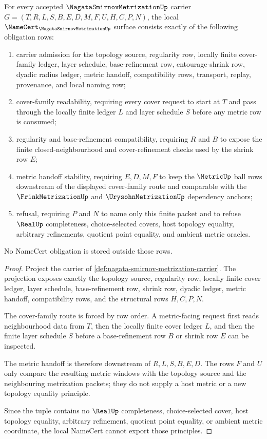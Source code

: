 \begin{theorem}
\label{thm:nagata-smirnov-metrization-namecert-obligations}
For every accepted $\NagataSmirnovMetrizationUp$ carrier $G=(T,R,L,S,B,E,D,M,F,U,H,C,P,N)$, the local $\NameCert_{\NagataSmirnovMetrizationUp}$ surface consists exactly of the following obligation rows:
\begin{enumerate}
\item carrier admission for the topology source, regularity row, locally finite cover-family ledger, layer schedule, base-refinement row, entourage-shrink row, dyadic radius ledger, metric handoff, compatibility rows, transport, replay, provenance, and local naming row;
\item cover-family readability, requiring every cover request to start at $T$ and pass through the locally finite ledger $L$ and layer schedule $S$ before any metric row is consumed;
\item regularity and base-refinement compatibility, requiring $R$ and $B$ to expose the finite closed-neighbourhood and cover-refinement checks used by the shrink row $E$;
\item metric handoff stability, requiring $E,D,M,F$ to keep the $\MetricUp$ ball rows downstream of the displayed cover-family route and comparable with the $\FrinkMetrizationUp$ and $\UrysohnMetrizationUp$ dependency anchors;
\item refusal, requiring $P$ and $N$ to name only this finite packet and to refuse $\RealUp$ completeness, choice-selected covers, host topology equality, arbitrary refinements, quotient point equality, and ambient metric oracles.
\end{enumerate}
No NameCert obligation is stored outside those rows.
\end{theorem}
\begin{proof}
Project the carrier of \autoref{def:nagata-smirnov-metrization-carrier}. The projection exposes exactly the topology source, regularity row, locally finite cover ledger, layer schedule, base-refinement row, shrink row, dyadic ledger, metric handoff, compatibility rows, and the structural rows $H,C,P,N$.

The cover-family route is forced by row order. A metric-facing request first reads neighbourhood data from $T$, then the locally finite cover ledger $L$, and then the finite layer schedule $S$ before a base-refinement row $B$ or shrink row $E$ can be inspected.

The metric handoff is therefore downstream of $R,L,S,B,E,D$. The rows $F$ and $U$ only compare the resulting metric windows with the topology source and the neighbouring metrization packets; they do not supply a host metric or a new topology equality principle.

Since the tuple contains no $\RealUp$ completeness, choice-selected cover, host topology equality, arbitrary refinement, quotient point equality, or ambient metric coordinate, the local NameCert cannot export those principles.
\end{proof}

